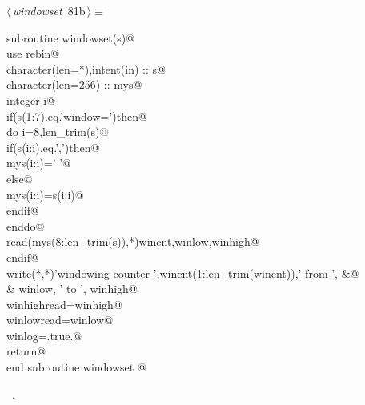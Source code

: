 \documentclass[10pt,a4paper,notitlepage]{article}
\begin{document}
\begin{flushleft} \small
\begin{minipage}{\linewidth}\label{scrap95}\raggedright\small
{} $\langle\,${\it windowset}\nobreak\ {\footnotesize {81b}}$\,\rangle\equiv$
\vspace{-1ex}
\begin{list}{}{} \item
\mbox{}\verb@      subroutine windowset(s)@\\
\mbox{}\verb@      use rebin@\\
\mbox{}\verb@      character(len=*),intent(in) :: s@\\
\mbox{}\verb@      character(len=256) :: mys@\\
\mbox{}\verb@      integer i@\\
\mbox{}\verb@      if(s(1:7).eq.'window=')then@\\
\mbox{}\verb@         do i=8,len_trim(s)@\\
\mbox{}\verb@           if(s(i:i).eq.',')then@\\
\mbox{}\verb@              mys(i:i)=' '@\\
\mbox{}\verb@           else@\\
\mbox{}\verb@              mys(i:i)=s(i:i)@\\
\mbox{}\verb@           endif@\\
\mbox{}\verb@         enddo@\\
\mbox{}\verb@         read(mys(8:len_trim(s)),*)wincnt,winlow,winhigh@\\
\mbox{}\verb@      endif@\\
\mbox{}\verb@      write(*,*)'windowing counter ',wincnt(1:len_trim(wincnt)),' from ', &@\\
\mbox{}\verb@     & winlow, ' to ', winhigh@\\
\mbox{}\verb@      winhighread=winhigh@\\
\mbox{}\verb@      winlowread=winlow@\\
\mbox{}\verb@      winlog=.true.@\\
\mbox{}\verb@      return@\\
\mbox{}\verb@      end subroutine windowset                                             @{\NWsep}
\end{list}
\vspace{-1.5ex}
\footnotesize
\begin{list}{}{\setlength{\itemsep}{-\parsep}\setlength{\itemindent}{-\leftmargin}}
\item \NWtxtMacroRefIn\ .

\item{}
\end{list}
\end{minipage}\vspace{4ex}
\end{flushleft}
\end{document}
